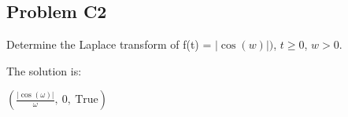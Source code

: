 \subsection{Problem C2} Determine the Laplace transform of f(t) = \(\left|{\cos{\left(w \right)}}\right|)\), \(t \geq 0\), \(w > 0\).

    \medskip
    The solution is:

    \smallskip
     \(\left( \frac{\left|{\cos{\left(\omega \right)}}\right|}{\omega}, \  0, \  \text{True}\right)\)
